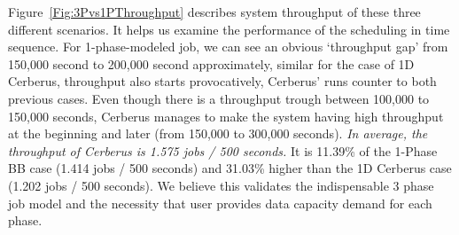 Figure~\ref{Fig:3Pvs1PThroughput} describes system throughput of these three different scenarios.
It helps us examine the performance of the scheduling in time sequence.
For 1-phase-modeled job, we can see an obvious `throughput gap'
from 150,000 second to 200,000 second approximately,
similar for the case of 1D Cerberus, throughput also starts provocatively,
Cerberus' runs counter to both previous cases.
Even though there is a throughput trough between 100,000 to 150,000 seconds,
Cerberus manages to make the system having high throughput at the beginning and
later (from 150,000 to 300,000 seconds).
\textit{In average, the throughput of Cerberus is 1.575 jobs / 500 seconds.}
It is 11.39\% of the 1-Phase BB case (1.414 jobs / 500 seconds) and
31.03\% higher than the 1D Cerberus case (1.202 jobs / 500 seconds).
We believe this validates the indispensable 3 phase job model and
the necessity that user provides data capacity demand for each phase.


